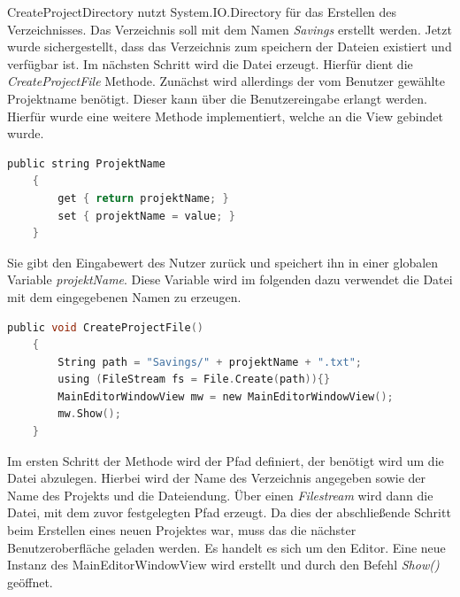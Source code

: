 CreateProjectDirectory nutzt System.IO.Directory für 
das Erstellen des Verzeichnisses. Das Verzeichnis soll mit dem Namen 
\textit{Savings} erstellt werden. 
\linebreak
Jetzt wurde sichergestellt, dass das Verzeichnis zum speichern der Dateien existiert und verfügbar ist. Im nächsten Schritt wird die 
Datei erzeugt. Hierfür dient die \textit{CreateProjectFile} Methode. Zunächst wird allerdings der vom Benutzer gewählte Projektname 
benötigt. Dieser kann über die  Benutzereingabe erlangt werden. Hierfür wurde eine weitere Methode implementiert, welche an die View gebindet wurde. 
\\
\begin{lstlisting}[language=C,
    frame=single,           % Ein Rahmen um den Code
    framexleftmargin=15pt,  % Rahmen link von den Zahlen
    style=algoBericht,
    label={ProjektName},
    captionpos=b,           % Caption unter den Code setzen
    caption={ProjektName}]
    public string ProjektName
    {
        get { return projektName; }
        set { projektName = value; }
    }
\end{lstlisting}
Sie gibt den Eingabewert des Nutzer zurück und speichert ihn in einer globalen Variable \textit{projektName}. Diese Variable wird 
im folgenden dazu verwendet die Datei mit dem eingegebenen Namen zu erzeugen.
\\
\begin{lstlisting}[language=C,
    frame=single,           % Ein Rahmen um den Code
    framexleftmargin=15pt,  % Rahmen link von den Zahlen
    style=algoBericht,
    label={ProjektName},
    captionpos=b,           % Caption unter den Code setzen
    caption={ProjektName}]
    public void CreateProjectFile()
    {
        String path = "Savings/" + projektName + ".txt";
        using (FileStream fs = File.Create(path)){}
        MainEditorWindowView mw = new MainEditorWindowView();
        mw.Show();
    }
\end{lstlisting}
Im ersten Schritt der Methode wird der Pfad definiert, der 
benötigt wird um die Datei abzulegen. Hierbei wird der 
Name des Verzeichnis angegeben sowie der Name des Projekts und die Dateiendung. Über einen \textit{Filestream} wird dann die Datei, 
mit dem zuvor festgelegten Pfad erzeugt. Da dies der abschließende Schritt beim Erstellen eines neuen Projektes war, muss das die 
nächster Benutzeroberfläche geladen werden. Es handelt es sich um den Editor. Eine neue Instanz des MainEditorWindowView wird erstellt 
und durch den Befehl \textit{Show()} geöffnet. 
\linebreak
